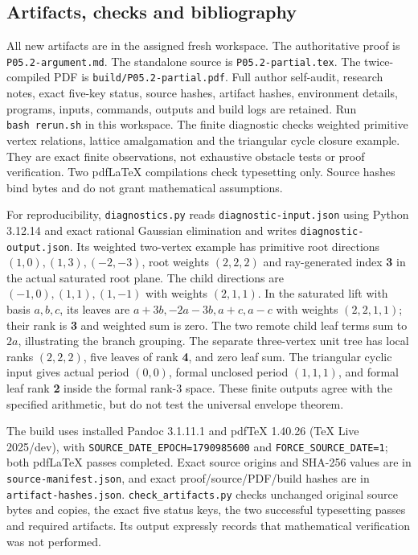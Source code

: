 \documentclass[
  11pt,
]{article}
\begin{document}
\subsection{Artifacts, checks and
bibliography}\label{artifacts-checks-and-bibliography}

All new artifacts are in the assigned fresh workspace. The authoritative
proof is \texttt{P05.2-argument.md}. The standalone source is
\texttt{P05.2-partial.tex}. The twice-compiled PDF is
\texttt{build/P05.2-partial.pdf}. Full author self-audit, research
notes, exact five-key status, source hashes, artifact hashes,
environment details, programs, inputs, commands, outputs and build logs
are retained. Run \texttt{bash\ rerun.sh} in this workspace. The finite
diagnostic checks weighted primitive vertex relations, lattice
amalgamation and the triangular cycle closure example. They are exact
finite observations, not exhaustive obstacle tests or proof
verification. Two pdfLaTeX compilations check typesetting only. Source
hashes bind bytes and do not grant mathematical assumptions.

For reproducibility, \texttt{diagnostics.py} reads
\texttt{diagnostic-input.json} using Python 3.12.14 and exact rational
Gaussian elimination and writes \texttt{diagnostic-output.json}. Its
weighted two-vertex example has primitive root directions
\((1,0),(1,3),(-2,-3)\), root weights \((2,2,2)\) and ray-generated
index \textbf{3} in the actual saturated root plane. The child
directions are \((-1,0),(1,1),(1,-1)\) with weights \((2,1,1)\). In the
saturated lift with basis \(a,b,c\), its leaves are
\(a+3b,-2a-3b,a+c,a-c\) with weights \((2,2,1,1)\); their rank is
\textbf{3} and weighted sum is zero. The two remote child leaf terms sum
to \textbf{\(2a\)}, illustrating the branch grouping. The separate
three-vertex unit tree has local ranks \((2,2,2)\), five leaves of rank
\textbf{4}, and zero leaf sum. The triangular cyclic input gives actual
period \textbf{\((0,0)\)}, formal unclosed period \textbf{\((1,1,1)\)},
and formal leaf rank \textbf{2} inside the formal rank-3 space. These
finite outputs agree with the specified arithmetic, but do not test the
universal envelope theorem.

The build uses installed Pandoc 3.1.11.1 and pdfTeX 1.40.26 (TeX Live
2025/dev), with \texttt{SOURCE\_DATE\_EPOCH=1790985600} and
\texttt{FORCE\_SOURCE\_DATE=1}; both pdfLaTeX passes completed. Exact
source origins and SHA-256 values are in \texttt{source-manifest.json},
and exact proof/source/PDF/build hashes are in
\texttt{artifact-hashes.json}. \texttt{check\_artifacts.py} checks
unchanged original source bytes and copies, the exact five status keys,
the two successful typesetting passes and required artifacts. Its output
expressly records that mathematical verification was not performed.
\end{document}
